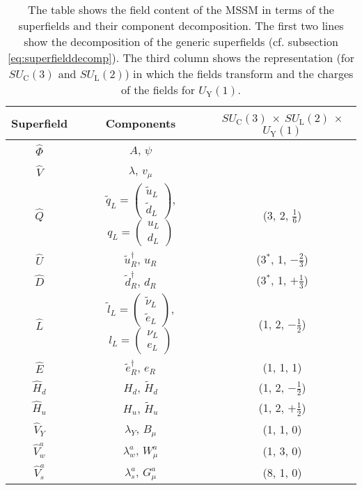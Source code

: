 \begin{table}
\begin{center}
\begin{tabular}{c|c|c}
Superfield & Components & $SU_\mathrm{C}(3)$ $\times$ $SU_\mathrm{L}(2)$ $\times$ $U_\mathrm{Y}(1)$\\
\hline
$\hat{\Phi}$ & $A$, $\psi$ & \\
$\hat{V}$ & $\lambda$, $v_\mu$ \\
$\hat{Q}$ & $\tilde{q}_L = \begin{pmatrix}
\tilde{u}_L \\
\tilde{d}_L
\end{pmatrix}$, $q_L = \begin{pmatrix}
u_L \\
d_L
\end{pmatrix}$ & (3, 2, $\frac{1}{6}$)\\
$\hat{U}$ & $\tilde{u}_R^\dagger$, $u_R$ & (3$^\ast$, 1, $-\frac{2}{3}$)\\
$\hat{D}$ & $\tilde{d}_R^\dagger$, $d_R$ & (3$^\ast$, 1, $+\frac{1}{3}$)\\
$\hat{L}$ & $\tilde{l}_L = \begin{pmatrix}
\tilde{\nu}_L \\
\tilde{e}_L
\end{pmatrix}$, $l_L = \begin{pmatrix}
\nu_L \\
e_L
\end{pmatrix}$ & (1, 2, $-\frac{1}{2}$)\\
$\hat{E}$ & $\tilde{e}_R^\dagger$, $e_R$ & (1, 1, 1)\\
$\hat{H}_d$ & $H_d$, $\tilde{H}_d$ & (1, 2, $-\frac{1}{2}$)\\
$\hat{H}_u$ & $H_u$, $\tilde{H}_u$ & (1, 2, $+\frac{1}{2}$)\\
$\hat{V}_Y$ & $\lambda_Y$, $B_\mu$ & (1, 1, 0)\\
$\hat{V}_w^a$ & $\lambda_w^a$, $W_\mu^a$ & (1, 3, 0)\\
$\hat{V}_s^a$ & $\lambda_s^a$, $G_\mu^a$ & (8, 1, 0)\\
\end{tabular}
\caption{The table shows the field content of the MSSM in terms of the superfields and their component decomposition. The first two lines show the decomposition of the generic superfields (cf. subsection \ref{eq:superfielddecomp}).\newline
The third column shows the representation (for $SU_\mathrm{C}(3)$ and $SU_\mathrm{L}(2)$) in which the fields transform and the charges of the fields for $U_\mathrm{Y}(1)$.}\label{tab:MSSMfieldcontent}
\end{center}
\end{table}
